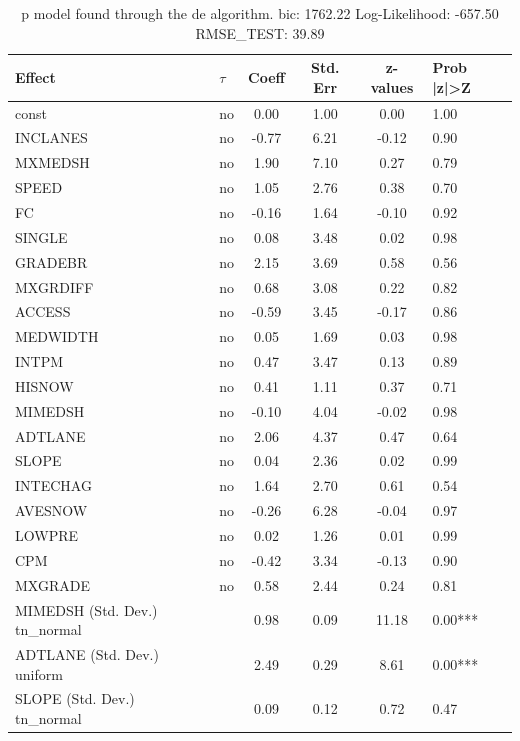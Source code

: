 \begin{table}
	\caption{p model found through the de algorithm. bic: 1762.22 Log-Likelihood: -657.50 RMSE_TEST: 39.89}
	\begin{center}
		\begin{tabular}{|l|l|c|c|c|l|}
			\hline
			Effect & $\tau$ & Coeff & Std. Err & z-values & Prob |z|>Z \\
			\hline
			const & no & 0.00 & 1.00 & 0.00 & 1.00 \\
			\hline
			INCLANES & no & -0.77 & 6.21 & -0.12 & 0.90 \\
			\hline
			MXMEDSH & no & 1.90 & 7.10 & 0.27 & 0.79 \\
			\hline
			SPEED & no & 1.05 & 2.76 & 0.38 & 0.70 \\
			\hline
			FC & no & -0.16 & 1.64 & -0.10 & 0.92 \\
			\hline
			SINGLE & no & 0.08 & 3.48 & 0.02 & 0.98 \\
			\hline
			GRADEBR & no & 2.15 & 3.69 & 0.58 & 0.56 \\
			\hline
			MXGRDIFF & no & 0.68 & 3.08 & 0.22 & 0.82 \\
			\hline
			ACCESS & no & -0.59 & 3.45 & -0.17 & 0.86 \\
			\hline
			MEDWIDTH & no & 0.05 & 1.69 & 0.03 & 0.98 \\
			\hline
			INTPM & no & 0.47 & 3.47 & 0.13 & 0.89 \\
			\hline
			HISNOW & no & 0.41 & 1.11 & 0.37 & 0.71 \\
			\hline
			MIMEDSH & no & -0.10 & 4.04 & -0.02 & 0.98 \\
			\hline
			ADTLANE & no & 2.06 & 4.37 & 0.47 & 0.64 \\
			\hline
			SLOPE & no & 0.04 & 2.36 & 0.02 & 0.99 \\
			\hline
			INTECHAG & no & 1.64 & 2.70 & 0.61 & 0.54 \\
			\hline
			AVESNOW & no & -0.26 & 6.28 & -0.04 & 0.97 \\
			\hline
			LOWPRE & no & 0.02 & 1.26 & 0.01 & 0.99 \\
			\hline
			CPM & no & -0.42 & 3.34 & -0.13 & 0.90 \\
			\hline
			MXGRADE & no & 0.58 & 2.44 & 0.24 & 0.81 \\
			\hline
			MIMEDSH (Std. Dev.) tn_normal &  & 0.98 & 0.09 & 11.18 & 0.00*** \\
			\hline
			ADTLANE (Std. Dev.) uniform &  & 2.49 & 0.29 & 8.61 & 0.00*** \\
			\hline
			SLOPE (Std. Dev.) tn_normal &  & 0.09 & 0.12 & 0.72 & 0.47 \\

\end{tabular}
\end{center}
\end{table}
